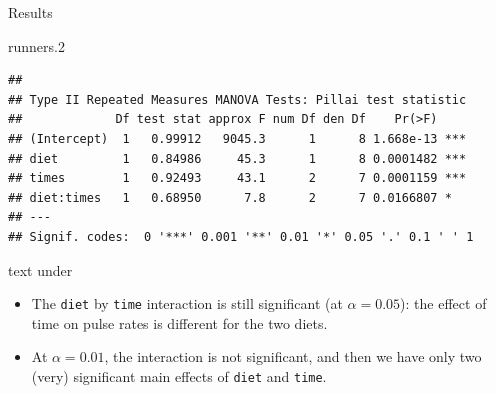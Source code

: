 \documentclass[ignorenonframetext,]{beamer}
\newenvironment{Shaded}{\begin{snugshade}}{\end{snugshade}}
\newcommand{\FloatTok}[1]{\textcolor[rgb]{0.00,0.00,0.81}{#1}}
\newcommand{\NormalTok}[1]{#1}
\begin{document}
\begin{frame}[fragile]{Results}
\protect\hypertarget{results-2}{}

\scriptsize

\begin{Shaded}
\begin{Highlighting}[]
\NormalTok{runners}\FloatTok{.2}
\end{Highlighting}
\end{Shaded}

\begin{verbatim}
## 
## Type II Repeated Measures MANOVA Tests: Pillai test statistic
##             Df test stat approx F num Df den Df    Pr(>F)    
## (Intercept)  1   0.99912   9045.3      1      8 1.668e-13 ***
## diet         1   0.84986     45.3      1      8 0.0001482 ***
## times        1   0.92493     43.1      2      7 0.0001159 ***
## diet:times   1   0.68950      7.8      2      7 0.0166807 *  
## ---
## Signif. codes:  0 '***' 0.001 '**' 0.01 '*' 0.05 '.' 0.1 ' ' 1
\end{verbatim}

\normalsize

text under

\begin{itemize}
\item
  The \texttt{diet} by \texttt{time} interaction is still significant
  (at \(\alpha=0.05\)): the effect of time on pulse rates is different
  for the two diets.
\item
  At \(\alpha=0.01\), the interaction is not significant, and then we
  have only two (very) significant main effects of \texttt{diet} and
  \texttt{time}.
\end{itemize}

\end{frame}
\end{document}

